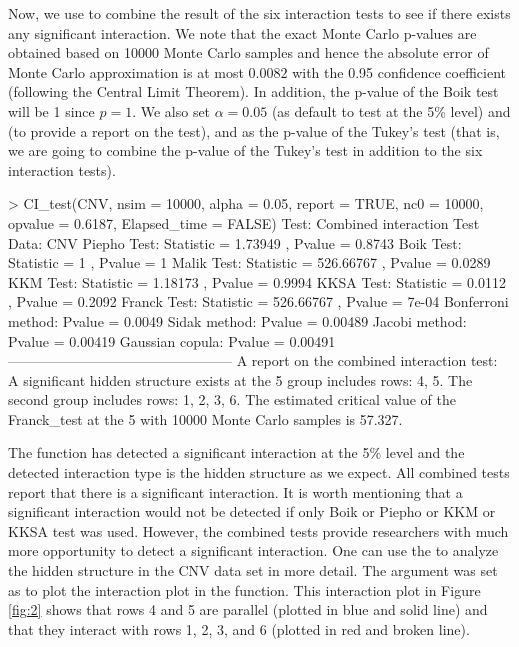 Now, we use  to combine the result of the six interaction tests to see if there exists any significant interaction. We note that the exact Monte Carlo p-values are obtained based on 10000 Monte Carlo samples and hence the absolute error of Monte Carlo approximation is at most $0.0082$ with the 0.95 confidence coefficient (following the Central Limit Theorem). In addition, the p-value of the Boik test will be {1} since $p=1$. We also set $\alpha=0.05$ (as default to test at the 5\% level) and  (to provide a report on the test), and  as the p-value of the Tukey's test (that is, we are going to combine the p-value of the Tukey's test in addition to the six interaction tests).

\begin{example}
	> CI_test(CNV, nsim = 10000, alpha = 0.05, report = TRUE, nc0 = 10000,
	opvalue = 0.6187, Elapsed_time = FALSE)
	Test:   Combined interaction Test 
	Data:   CNV 
	Piepho Test: Statistic =  1.73949 , Pvalue =  0.8743 
	Boik Test: Statistic =  1 , Pvalue =  1 
	Malik Test: Statistic =  526.66767 , Pvalue =  0.0289 
	KKM Test: Statistic =  1.18173 , Pvalue =  0.9994 
	KKSA Test: Statistic =  0.0112 , Pvalue =  0.2092 
	Franck Test: Statistic =  526.66767 , Pvalue =  7e-04 
	Bonferroni method: Pvalue = 0.0049 
	Sidak method: Pvalue = 0.00489 
	Jacobi method: Pvalue = 0.00419 
	Gaussian copula: Pvalue = 0.00491 
	------------------------------------------------ 
	A report on the combined interaction test:
	A  significant  hidden  structure  exists  at  the 5%
	group  includes  rows:  4, 5. The second group includes rows: 1, 2, 3,
	6.  The  estimated  critical  value of the Franck_test at the 5%
	with 10000 Monte Carlo samples is 57.327.
 \end{example}

The  function has detected a significant interaction at the 5$\%$ level and the detected interaction type is the hidden structure as we expect. All combined tests report that there is a significant interaction. It is worth mentioning that a significant interaction would not be detected if only Boik or Piepho or KKM or KKSA test was used. However, the combined tests provide researchers with much more opportunity to detect a significant interaction. One can use the  to analyze  the hidden structure in the CNV data set in more detail. The argument  was set as  to plot the interaction plot in the  function. This interaction plot in Figure \ref{fig:2} shows that rows 4 and 5 are parallel (plotted in blue and solid line) and that they interact with rows 1, 2, 3, and 6 (plotted in red and broken line).  


